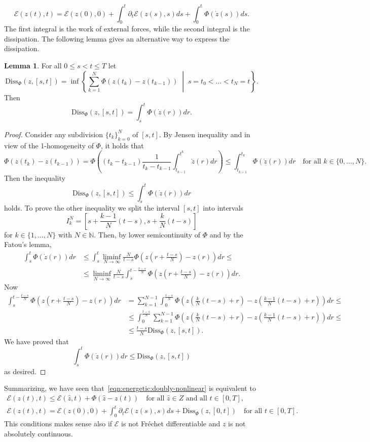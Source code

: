 \documentclass[a4paper,10pt,oneside]{amsbook}
\numberwithin{section}{chapter}
\numberwithin{equation}{chapter}
\theoremstyle{definition}
\newtheorem{lemma}[prop]{Lemma}
\begin{document}
\[
\mathcal{E}(z(t),t)=\mathcal{E}(z(0),0)+\int_0^t\partial_t\mathcal{E}(z(s),s)ds+\int_0^t\Phi(\dot z(s))ds.
\]
The first integral is the work of external forces, while the second integral is the dissipation. The following lemma gives an alternative way to express the dissipation.
\begin{lemma}
For all $0\le s<t\le T$ let
\[
\text{Diss}_\Phi(z,[s,t])=\inf\left\{\sum_{k=1}^N\Phi(z(t_k)-z(t_{k-1}))\;\middle|\;s=t_0<\dots<t_N=t\right\}.
\]
Then
\[
\text{Diss}_\Phi(z,[s,t])=\int_s^t\Phi(\dot z(r))dr.
\]
\end{lemma}
\begin{proof}
Consider any subdivision $\{t_k\}_{k=0}^N$ of $[s,t]$. By Jensen inequality and in view of the 1-homogeneity of $\Phi$, it holds that
\[
\Phi(z(t_k)-z(t_{k-1}))=\Phi\left((t_k-t_{k-1})\frac{1}{t_k-t_{k-1}}\int_{t_{k-1}}^{t^k}\dot z(r)dr\right)\le\int_{t_{k-1}}^{t_k}\Phi(\dot z(r))dr\quad\text{for all $k\in\{0,\dots,N\}$}.
\]
Then the inequality
\[
\text{Diss}_\Phi(z,[s,t])\le\int_s^t\Phi(\dot z(r))dr
\]
holds. To prove the other inequality we split the interval $[s,t]$ into intervals
\[
I_k^N=\left[s+\frac{k-1}{N}(t-s),s+\frac{k}{N}(t-s)\right]
\]
for $k\in\{1,\dots,N\}$ with $N\in\mathbb{N}$. Then, by lower semicontinuity of $\Phi$ and by the Fatou's lemma,
\[
\begin{split}
\int_s^{t}\Phi(\dot z(r))dr&\le\int_s^t\liminf_{N\to\infty}\frac{N}{t-s}\Phi\left(z\left(r+\frac{t-s}{N}\right)-z(r)\right)dr\le\\
&\le\liminf_{N\to\infty}\frac{N}{t-s}\int_s^{t-\frac{t-s}{N}}\Phi\left(z\left(r+\frac{t-s}{N}\right)-z(r)\right)dr.
\end{split}
\]
Now
\[
\begin{split}
\int_s^{t-\frac{t-s}{N}}\Phi\left(z\left(r+\frac{t-s}{N}\right)-z(r)\right)dr&=\sum_{k=1}^{N-1}\int_0^{\frac{t-s}{N}}\Phi\left(z\left(\frac{k}{N}(t-s)+r\right)-z\left(\frac{k-1}{N}(t-s)+r\right)\right)dr\le\\
&\le\int_0^{\frac{t-s}{N}}\sum_{k=1}^{N-1}\Phi\left(z\left(\frac{k}{N}(t-s)+r\right)-z\left(\frac{k-1}{N}(t-s)+r\right)\right)dr\le\\
&\le\frac{t-s}{N}\text{Diss}_\Phi(z,[s,t]).
\end{split}
\]
We have proved that
\[
\int_s^{t}\Phi(\dot z(r))dr\le\text{Diss}_\Phi(z,[s,t])
\]
as desired.
\end{proof}
Summarizing, we have seen that~\eqref{eqn:energetic:doubly-nonlinear} is equivalent to
\begin{subequations}
\label{eqn:energetic:motivation-definition}
\begin{gather}
\mathcal{E}(z(t),t)\le\mathcal{E}(\hat{z},t)+\Phi(\hat{z}-z(t))\quad\text{for all $\hat{z}\in Z$ and all $t\in[0,T]$},\\
\mathcal{E}(z(t),t)=\mathcal{E}(z(0),0)+\int_0^t\partial_t\mathcal{E}(z(s),s)ds+\text{Diss}_\Phi(z,[0,t])\quad\text{for all $t\in[0,T]$}.
\end{gather}
\end{subequations}
This conditions makes sense also if $\mathcal{E}$ is not Fréchet differentiable and $z$ is not absolutely continuous.
\end{document}
